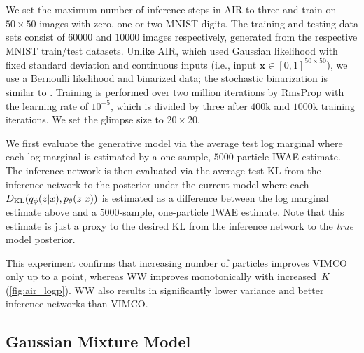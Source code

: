 We set the maximum number of inference steps in \gls{AIR} to three and train on $50 \times 50$ images with zero, one or two \acrshort{MNIST} digits.
The training and testing data sets consist of $60000$ and $10000$ images respectively, generated from the respective \acrshort{MNIST} train/test datasets.
Unlike \gls{AIR}, which used Gaussian likelihood with fixed standard deviation and continuous inputs (i.e., input $\mathbf{x} \in [0, 1]^{50 \times 50}$), we use a Bernoulli likelihood and binarized data; the stochastic binarization is similar to \citet{Burda2016importance}.
Training is performed over two million iterations by RmsProp \citep{Tieleman2012rms} with the learning rate of $10^{-5}$, which is divided by three after $400$k and $1000$k training iterations.
We set the glimpse size to $20 \times 20$.

We first evaluate the generative model via the average test log marginal where each log marginal is estimated by a one-sample, $5000$-particle \gls{IWAE} estimate.
The inference network is then evaluated via the average test \gls{KL} from the inference network to the posterior under the current model where each $D_{\mathrm{KL}}(q_\phi(z \lvert x), p_\theta(z \lvert x))$ is estimated as a difference between the log marginal estimate above and a $5000$-sample, one-particle \gls{IWAE} estimate.
Note that this estimate is just a proxy to the desired \gls{KL} from the inference network to the \emph{true} model posterior.

This experiment confirms that increasing number of particles improves \gls{VIMCO} only up to a point, whereas \gls{WW} improves monotonically with increased~\(K\) (\cref{fig:air_logp}).
\Gls{WW} also results in significantly lower variance and better inference networks than \gls{VIMCO}.












\subsection{Gaussian Mixture Model}
\label{sec:experiments/gmm}

